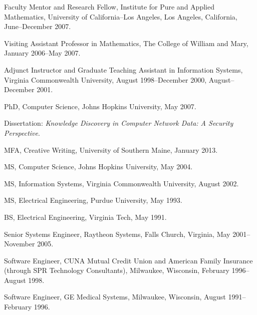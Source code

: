 \documentclass[11pt,article,oneside]{memoir}
\begin{document}
\ind Faculty Mentor and Research Fellow, Institute for Pure and Applied Mathematics, University of California--Los Angeles, Los Angeles, California, June--December 2007.


\ind Visiting Assistant Professor in Mathematics,
The College of William and Mary, January 2006--May 2007.

\ind Adjunct Instructor and Graduate Teaching Assistant in Information Systems, Virginia Commonwealth University, August 1998--December 2000, August--December 2001.

\bigskip




\ind PhD, Computer Science, Johns Hopkins University, May 2007.

\ind \hspace{0.35in} \footnotesize Dissertation: \emph{Knowledge Discovery in Computer Network Data: A Security Perspective}.\normalsize \vspace{0.05in}

\ind MFA, Creative Writing, University of Southern Maine, January 2013. 

\ind MS, Computer Science, Johns Hopkins University, May 2004. 

\ind MS, Information Systems, Virginia Commonwealth University, August 2002. 

\ind MS, Electrical Engineering, Purdue University, May 1993. 


\ind BS, Electrical Engineering, Virginia Tech, May 1991. 


\bigskip



\ind Senior Systems Engineer, Raytheon Systems, Falls Church, Virginia, May 2001--November 2005.

\ind Software Engineer, CUNA Mutual Credit Union and American Family Insurance (through SPR Technology Consultants), Milwaukee, Wisconsin, February 1996--August 1998.

\ind Software Engineer, GE Medical Systems, Milwaukee, Wisconsin, August 1991--February 1996.

\bigskip
 
\medskip
\end{document}
